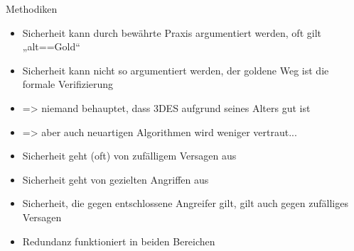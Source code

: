 \begin{frame}[T]{Methodiken}
  \begin{itemize}
    \item Sicherheit kann durch bewährte Praxis argumentiert werden, oft gilt „alt==Gold“
    \item Sicherheit kann nicht so argumentiert werden, der goldene Weg ist die formale Verifizierung
    \item => niemand behauptet, dass 3DES aufgrund seines Alters gut ist
    \item => aber auch neuartigen Algorithmen wird weniger vertraut...
    \item Sicherheit geht (oft) von zufälligem Versagen aus
    \item Sicherheit geht von gezielten Angriffen aus
    \item Sicherheit, die gegen entschlossene Angreifer gilt, gilt auch gegen zufälliges Versagen
    \item Redundanz funktioniert in beiden Bereichen
  \end{itemize}
\end{frame}

